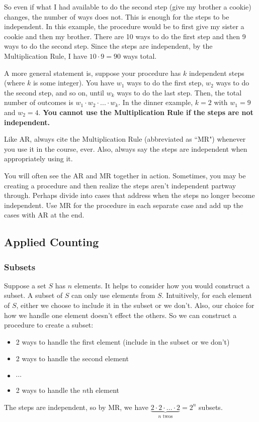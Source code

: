 \documentclass[11pt]{scrartcl}
\begin{document}
So even if what I had available to do the second step (give my brother a cookie) changes, the number of ways does not. This is enough for the steps to be independent. In this example, the procedure would be to first give my sister a cookie and then my brother. There are 10 ways to do the first step and then 9 ways to do the second step. Since the steps are independent, by the Multiplication Rule, I have $10 \cdot 9 = 90$ ways total.

A more general statement is, suppose your procedure has $k$ independent steps (where $k$ is some integer). You have $w_1$ ways to do the first step, $w_2$  ways to do the second step, and so on, until $w_k$ ways to do the last step. Then, the total number of outcomes is $w_1 \cdot w_2 \cdot ... \cdot w_k$. In the dinner example, $k = 2$ with $w_1 = 9$ and $w_2 = 4$. \textbf{You cannot use the Multiplication Rule if the steps are not independent.}

\begin{caveat}
Like AR, always cite the Multiplication Rule (abbreviated as ``MR") whenever you use it in the course, ever. Also, always say the steps are independent when appropriately using it.
\end{caveat}

\begin{advice}
You will often see the AR and MR together in action. Sometimes, you may be creating a procedure and then realize the steps aren't independent partway through. Perhaps divide into cases that address when the steps no longer become independent. Use MR for the procedure in each separate case and add up the cases with AR at the end.
\end{advice}

\subsection{Applied Counting}

\subsubsection{Subsets}

Suppose a set $S$ has $n$ elements. It helps to consider how you would construct a subset. A subset of $S$ can only use elements from $S$. Intuitively, for each element of $S$, either we choose to include it in the subset or we don't. Also, our choice for how we handle one element doesn't effect the others. So we can construct a procedure to create a subset:
\begin{itemize}
    \item 2 ways to handle the first element (include in the subset or we don't)
    \item 2 ways to handle the second element
    \item $\cdots$
    \item 2 ways to handle the $n$th element
\end{itemize}
The steps are independent, so by MR, we have $\underbrace{2 \cdot 2 \cdot ... \cdot 2}_\text{$n$ twos} = 2^n$ subsets.
\end{document}
